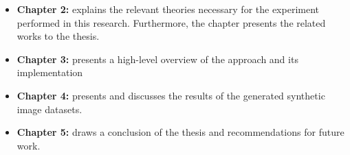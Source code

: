 \begin{itemize}
    
    \item \textbf{Chapter 2:} explains the relevant theories necessary for the experiment performed in this research. Furthermore, the chapter presents the related works to the thesis.

    \item \textbf{Chapter 3:} presents a high-level overview of the approach and its implementation

    \item \textbf{Chapter 4:} presents and discusses the results of the generated synthetic image datasets.

    \item \textbf{Chapter 5:} draws a conclusion of the thesis and recommendations for future work. 
    
\end{itemize}






